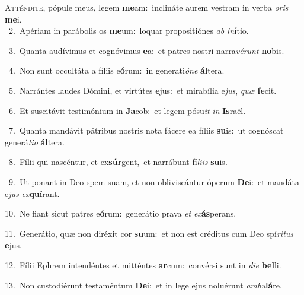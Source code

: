 \lettrine{\initial\textcolor{\initialcolor}{A}}{tténdite,} pópule meus, legem \textbf{me}\-am:~\star inclináte aurem vestram in verba \textit{o}\-\textit{ris} \textbf{me}\-i.\\
{\numbfont\textcolor{\numbcolor}{~2.}}~Apériam in parábolis os \textbf{me}\-um:~\star loquar propositiónes \textit{ab} \textit{in}\-\textbf{í}tio.\par
{\numbfont\textcolor{\numbcolor}{~3.}}~Quanta audívimus et cognóvimus \textbf{e}\-a:~\star et patres nostri narra\-\textit{vé}\-\textit{runt} \textbf{no}\-bis.\par
{\numbfont\textcolor{\numbcolor}{~4.}}~Non sunt occultáta a fíliis e\-\textbf{ó}\-rum:~\star in generati\-\textit{ó}\-\textit{ne} \textbf{ál}\-tera.\par
{\numbfont\textcolor{\numbcolor}{~5.}}~Narrántes laudes Dómini, et virtútes \textbf{e}\-jus:~\star et mirabília e\-\textit{jus}\-, \textit{quæ} \textbf{fe}\-cit.\par
{\numbfont\textcolor{\numbcolor}{~6.}}~Et suscitávit testimónium in \textbf{Ja}\-cob:~\star et legem pósu\textit{it} \textit{in} \textbf{Is}\-raël.\par
{\numbfont\textcolor{\numbcolor}{~7.}}~Quanta mandávit pátribus nostris nota fácere ea fíliis \textbf{su}\-is:~\star ut cognóscat generá\-\textit{ti}\-\textit{o} \textbf{ál}\-tera.\par
{\numbfont\textcolor{\numbcolor}{~8.}}~Fílii qui nascéntur, et ex\-\textbf{súr}\-gent,~\star et narrábunt fí\-\textit{li}\-\textit{is} \textbf{su}\-is.\par
{\numbfont\textcolor{\numbcolor}{~9.}}~Ut ponant in Deo spem suam, et non obliviscántur óperum \textbf{De}\-i:~\star et mandáta e\textit{jus} \textit{ex}\-\textbf{quí}rant.\par
{\numbfont\textcolor{\numbcolor}{10.}}~Ne fiant sicut patres e\-\textbf{ó}\-rum:~\star generátio prava \textit{et} \textit{ex}\-\textbf{ás}perans.\par
{\numbfont\textcolor{\numbcolor}{11.}}~Generátio, quæ non diréxit cor \textbf{su}\-um:~\star et non est créditus cum Deo spí\-\textit{ri}\-\textit{tus} \textbf{e}\-jus.\par
{\numbfont\textcolor{\numbcolor}{12.}}~Fílii Ephrem intendéntes et mitténtes \textbf{ar}\-cum:~\star convérsi sunt in \textit{di}\-\textit{e} \textbf{bel}\-li.\par
{\numbfont\textcolor{\numbcolor}{13.}}~Non custodiérunt testaméntum \textbf{De}\-i:~\star et in lege ejus noluérunt \textit{am}\-\textit{bu}\textbf{lá}re.\par
